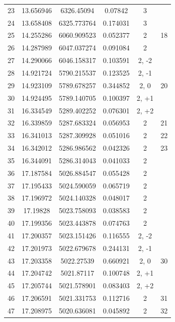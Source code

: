 \documentclass{aa}
\begin{document}
\begin{table}[b]
\begin{tabular}{c|c|c|c|c|c}
23  &  13.656946 &   6326.45094 &   0.07842 &    3  &         \\
24  &  13.658408 &  6325.773764 &  0.174031 &    3  &         \\
25  &  14.255286 &  6060.909523 &  0.052377 &    2  &     18 \\
26  &  14.287989 &  6047.037274 &  0.091084 &    2  &         \\
27  &  14.290066 &  6046.158317 &  0.103591 &    2, -2  &      \\
28  &  14.921724 &  5790.215537 &  0.123525 &    2, -1  &      \\
29  &  14.923109 &  5789.678257 &  0.344852 &    2, 0  &    20     \\
30  &  14.924495 &  5789.140705 &  0.100397 &    2, +1  &         \\
31  &  16.334549 &  5289.402252 &  0.076301 &    2, +2  &      \\
32  &  16.339859 &  5287.683324 &  0.056953 &    2  &     21 \\
33  &  16.341013 &  5287.309928 &  0.051016 &    2  &     22 \\
34  &  16.342012 &  5286.986562 &  0.042326 &    2  &     23 \\
35  &  16.344091 &  5286.314043 &  0.041033 &    2  &         \\
36  &  17.187584 &  5026.884547 &  0.055428 &   2  &         \\
37  &  17.195433 &  5024.590059 &  0.065719 &   2  &         \\
38  &  17.196972 &  5024.140328 &  0.048017 &    2  &         \\
39  &   17.19828 &  5023.758093 &  0.038583 &    2  &         \\
40  &  17.199356 &  5023.443878 &  0.074763 &    2  &         \\
41  &  17.200357 &  5023.151426 &  0.116555 &    2, -2  &         \\
42  &  17.201973 &  5022.679678 &  0.244131 &    2, -1  &         \\
43  &  17.203358 &   5022.27539 &  0.660921 &    2, 0  &     30 \\
44  &  17.204742 &   5021.87117 &  0.100748 &    2, +1  &      \\
45  &  17.205744 &  5021.578901 &  0.083403 &    2, +2  &      \\
46  &  17.206591 &  5021.331753 &  0.112716 &    2  &     31 \\
47  &  17.208975 &  5020.636081 &  0.045892 &    2  &     32 \\

\end{tabular}
\end{table}
\end{document}
